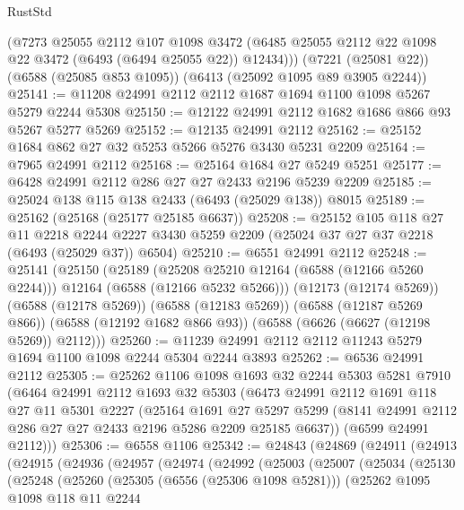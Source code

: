 \begin{lexlean}{RustStd}
\begin{coremodule}
      (@7273
        @25055
        @2112
        @107
        @1098
        @3472
        (@6485 @25055 @2112 @22 @1098 @22 @3472 (@6493 (@6494 @25055 @22)) @12434)))
    (@7221 (@25081 @22))
    (@6588 (@25085 @853 @1095))
    (@6413 (@25092 @1095 @89 @3905 @2244))
@25141 := @11208 @24991 @2112 @2112 @1687 @1694 @1100 @1098 @5267 @5279 @2244 @5308
@25150 := @12122 @24991 @2112 @1682 @1686 @866 @93 @5267 @5277 @5269
@25152 := @12135 @24991 @2112
@25162 := @25152 @1684 @862 @27 @32 @5253 @5266 @5276 @3430 @5231 @2209
@25164 := @7965 @24991 @2112
@25168 := @25164 @1684 @27 @5249 @5251
@25177 := @6428 @24991 @2112 @286 @27 @27 @2433 @2196 @5239 @2209
@25185 := @25024 @138 @115 @138 @2433 (@6493 (@25029 @138)) @8015
@25189 := @25162 (@25168 (@25177 @25185 @6637))
@25208 := @25152
    @105
    @118
    @27
    @11
    @2218
    @2244
    @2227
    @3430
    @5259
    @2209
    (@25024 @37 @27 @37 @2218 (@6493 (@25029 @37)) @6504)
@25210 := @6551 @24991 @2112
@25248 := @25141
    (@25150
      (@25189
        (@25208 @25210 @12164 (@6588 (@12166 @5260 @2244)))
        @12164
        (@6588 (@12166 @5232 @5266)))
      (@12173 (@12174 @5269))
      (@6588 (@12178 @5269))
      (@6588 (@12183 @5269))
      (@6588 (@12187 @5269 @866))
      (@6588 (@12192 @1682 @866 @93))
      (@6588 (@6626 (@6627 (@12198 @5269)) @2112)))
@25260 := @11239 @24991 @2112 @2112 @11243 @5279 @1694 @1100 @1098 @2244 @5304 @2244 @3893
@25262 := @6536 @24991 @2112
@25305 := @25262
    @1106
    @1098
    @1693
    @32
    @2244
    @5303
    @5281
    @7910
    (@6464
      @24991
      @2112
      @1693
      @32
      @5303
      (@6473
        @24991
        @2112
        @1691
        @118
        @27
        @11
        @5301
        @2227
        (@25164
          @1691
          @27
          @5297
          @5299
          (@8141 @24991 @2112 @286 @27 @27 @2433 @2196 @5286 @2209 @25185 @6637))
        (@6599 @24991 @2112)))
@25306 := @6558 @1106
@25342 := @24843
    (@24869
      (@24911
        (@24913
          (@24915
            (@24936
              (@24957
                (@24974
                  (@24992
                    (@25003
                      (@25007
                        (@25034
                          (@25130
                            (@25248
                              (@25260
                                (@25305 (@6556 (@25306 @1098 @5281)))
                                (@25262
                                  @1095
                                  @1098
                                  @118
                                  @11
                                  @2244

\end{coremodule}
\end{lexlean}
